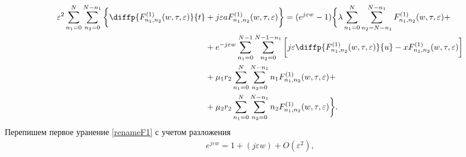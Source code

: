 \begin{equation}
\begin{split}
		\varepsilon^{2}\sum_{n_1=0}^N\sum_{n_2=0}^{N-n_1}\bigg\{ \diffp{F_{n_1,n_2}^{(1)}(w,\tau,\varepsilon)}{t}&+j\varepsilon a F_{n_1,n_2}^{(1)}(w,\tau,\varepsilon)\bigg\}=
		(e^{j\varepsilon w} - 1)\bigg\{\lambda \sum_{n_1=0}^N\sum_{n_2=N-n_1}^{N-n_1} 
		F_{n_1, n_2}^{(1)}(w,\tau,\varepsilon)+\\
		&+e^{-j\varepsilon w} \sum_{n_1=0}^{N-1}\sum_{n_2=0}^{N-1-n_1} 
		\bigg[ j \varepsilon \diffp{ F_{n_1, n_2}^{(1)}(w,\tau,\varepsilon)}{u}-xF_{n_1, n_2}^{(1)}(w,\tau,\varepsilon)\bigg]\\
		&+\mu_1 r_2 \sum_{n_1=0}^{N}\sum_{n_2=0}^{N-n_1} 
		n_1 F_{n_1, n_2}^{(1)}(w,\tau,\varepsilon)+\\
		&+\mu_2 r_2 \sum_{n_1=0}^{N}\sum_{n_2=0}^{N-n_1} 
		n_2 F_{n_1, n_2}^{(1)}(w,\tau,\varepsilon)\bigg\}.
	\end{split}
\end{equation}
Перепишем первое уранение  \eqref{renameF1} с учетом разложения
\begin{align}
e^{j\varepsilon w}=1+(j\varepsilon w)+O(\varepsilon^2),
\end{align}

